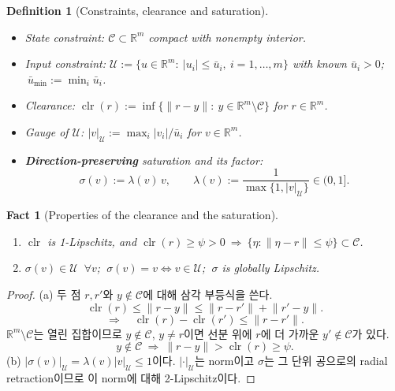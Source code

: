 \documentclass[11pt]{article}\usepackage[margin=1in]{geometry}\usepackage{amsmath,amssymb,amsthm,mathtools}\usepackage{graphicx}\graphicspath{{figures/}{../figures/}{figs/}{./}}\usepackage{enumitem}\usepackage{hyperref}\usepackage{cleveref}\usepackage{tikz}\usetikzlibrary{arrows.meta,positioning,calc,shapes.geometric}\usepackage{float}\usepackage[most]{tcolorbox}\usepackage{kotex}\usepackage{booktabs}\emergencystretch=1.6em\tolerance=2000 \crefname{assumption}{Assumption}{Assumptions}\Crefname{assumption}{Assumption}{Assumptions}\crefname{definition}{Definition}{Definitions}\Crefname{definition}{Definition}{Definitions}\crefname{proposition}{Proposition}{Propositions}\Crefname{proposition}{Proposition}{Propositions}\crefname{fact}{Fact}{Facts}\Crefname{fact}{Fact}{Facts} \newtheorem{assumption}{Assumption}\newtheorem{definition}{Definition}\newtheorem{lemma}{Lemma}\newtheorem{proposition}{Proposition}\newtheorem{theorem}{Theorem}\newtheorem{corollary}{Corollary}\newtheorem{fact}{Fact}\theoremstyle{remark}\newtheorem{remark}{Remark} \newcommand{\R}{\mathbb{R}}\newcommand{\U}{\mathcal U}
\newcommand{\Cset}{\mathcal C}\newcommand{\Pcl}{\mathcal P}\newcommand{\Zset}{\mathcal Z_0}\newcommand{\Xset}{\mathcal X_0}
\DeclareMathOperator{\clr}{clr}\newcommand{\norm}[1]{\lVert #1\rVert}\newcommand{\what}{\hat w}
\begin{document}
\begin{definition}[Constraints, clearance and saturation]
\label{def:constraints}
\begin{itemize}
\item State constraint: $\Cset\subset\R^m$ compact with nonempty interior.
\item Input constraint: $\U:=\{u\in\R^m:\ |u_i|\le\bar u_i,\ i=1,\dots,m\}$ with known $\bar u_i>0$; $\ \bar u_{\min}:=\min_i\bar u_i$.
\item Clearance: $\clr(r):=\inf\{\norm{r-y}:\ y\in\R^m\setminus\Cset\}$ for $r\in\R^m$.
\item Gauge of $\U$: $|v|_{\U}:=\max_i|v_i|/\bar u_i$ for $v\in\R^m$.
\item \textbf{\emph{Direction-preserving}} saturation and its factor:
\[
\sigma(v):=\lambda(v)\,v,\qquad \lambda(v):=\frac{1}{\max\{1,|v|_{\U}\}}\in(0,1].
\]
\end{itemize}
\end{definition}

\begin{fact}[Properties of the clearance and the saturation]
\label{fact:clr}
\begin{enumerate}[label=(\alph*)]
\item $\clr$ is 1-Lipschitz, and $\clr(r)\ge\psi>0\ \Rightarrow\ \{\eta:\norm{\eta-r}\le\psi\}\subset\Cset$.
\item $\sigma(v)\in\U$ $\ \forall v$; $\ \sigma(v)=v\iff v\in\U$; $\ \sigma$ is globally Lipschitz.
\end{enumerate}
\end{fact}

\begin{proof}
(a) 두 점 $r,r'$와 $y\notin\Cset$에 대해 삼각 부등식을 쓴다.
\[
\clr(r)\le\norm{r-y}\le\norm{r-r'}+\norm{r'-y}.
\]
\[
\Longrightarrow\quad \clr(r)-\clr(r')\le\norm{r-r'}.
\]
$\R^m\setminus\Cset$는 열린 집합이므로 $y\notin\Cset$, $y\ne r$이면 선분 위에 $r$에 더 가까운 $y'\notin\Cset$가 있다.
\[
y\notin\Cset\ \Longrightarrow\ \norm{r-y}>\clr(r)\ge\psi .
\]
(b) $|\sigma(v)|_{\U}=\lambda(v)|v|_{\U}\le1$이다. $|\cdot|_{\U}$는 norm이고 $\sigma$는 그 단위 공으로의 radial retraction이므로 이 norm에 대해 2-Lipschitz이다.
\end{proof}
\end{document}
